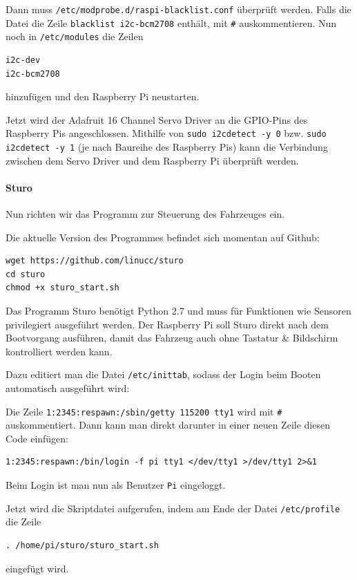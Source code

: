 \documentclass[a4paper,10pt]{scrartcl}
\begin{document}
    Dann muss \lstinline{/etc/modprobe.d/raspi-blacklist.conf} überprüft werden.
    Falls die Datei die Zeile \lstinline{blacklist i2c-bcm2708} enthält, mit
    \lstinline{#} auskommentieren.
    Nun noch in \lstinline{/etc/modules} die Zeilen
    \begin{lstlisting}
i2c-dev
i2c-bcm2708
    \end{lstlisting}

    hinzufügen und den Raspberry Pi neustarten.

    Jetzt wird der Adafruit 16 Channel Servo Driver an die GPIO-Pins des
    Raspberry Pis angeschlossen.
    Mithilfe von \lstinline{sudo i2cdetect -y 0} bzw.
    \lstinline{sudo i2cdetect -y 1} (je nach Baureihe des Raspberry Pis) kann
    die Verbindung zwischen dem Servo Driver und dem Raspberry Pi überprüft
    werden.\cite{adafruitlearn}

  \paragraph{Sturo} Nun richten wir das Programm zur Steuerung des Fahrzeuges
    ein.

    Die aktuelle Version des Programmes befindet sich momentan auf Github:

    \begin{lstlisting}
wget https://github.com/linucc/sturo
cd sturo
chmod +x sturo_start.sh
    \end{lstlisting}

    Das Programm Sturo benötigt Python 2.7 und muss für Funktionen wie Sensoren
    privilegiert ausgeführt werden.
    Der Raspberry Pi soll Sturo direkt nach dem Bootvorgang ausführen, damit
    das Fahrzeug auch ohne Tastatur \& Bildschirm kontrolliert werden kann.

    Dazu editiert man die Datei \lstinline{/etc/inittab}, sodass der Login beim
    Booten automatisch ausgeführt wird:

    Die Zeile \lstinline{1:2345:respawn:/sbin/getty 115200 tty1} wird mit
    \lstinline{#} auskommentiert.
    Dann kann man direkt darunter in einer neuen Zeile diesen Code einfügen:
    \begin{lstlisting}
1:2345:respawn:/bin/login -f pi tty1 </dev/tty1 >/dev/tty1 2>&1
    \end{lstlisting}
    Beim Login ist man nun als Benutzer \lstinline{Pi} eingeloggt.
    \cite{opentech}

    Jetzt wird die Skriptdatei aufgerufen, indem am Ende der Datei
    \lstinline{/etc/profile} die Zeile
    \begin{lstlisting}
. /home/pi/sturo/sturo_start.sh
    \end{lstlisting}
    eingefügt wird.
\end{document}

